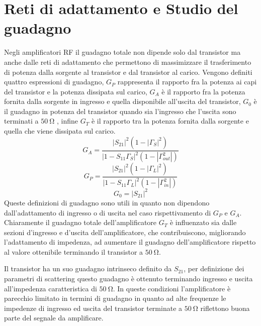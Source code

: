 \documentclass[12pt,oneside]{book}
\begin{document}
\section{Reti di adattamento e Studio del guadagno}
Negli amplificatori RF il guadagno totale non dipende solo dal transistor ma anche dalle reti di adattamento che permettono di massimizzare il trasferimento di potenza dalla sorgente al transistor e dal transistor al carico.
Vengono definiti quattro espressioni di guadagno, $G_P$ rappresenta il rapporto fra la potenza ai capi del transistor e la potenza dissipata sul carico,
$G_A$ è il rapporto fra la potenza fornita dalla sorgente in ingresso e quella disponibile all'uscita del transistor, $G_0$ è il guadagno in potenza del transistor quando sia l'ingresso che l'uscita sono terminati a $\SI{50}{\ohm}$ , infine $G_T$ è il rapporto tra la potenza fornita dalla sorgente e quella che viene dissipata sul carico.
\begin{equation}
    G_A = \dfrac{\left|S_{21}\right|^2\left(1-\left|\Gamma_{S}\right|^2\right)}{\left|1-S_{11}\Gamma_{S}\right|^2\left(1-\left|\Gamma_{out}^2\right|\right)}
\end{equation}
\begin{equation}
    G_P = \dfrac{\left|S_{21}\right|^2\left(1-\left|\Gamma_{L}\right|^2\right)}{\left|1-S_{11}\Gamma_{L}\right|^2\left(1-\left|\Gamma_{in}^2\right|\right)}
\end{equation}
\begin{equation}
    G_0 = \left|S_{21}\right|^2
\end{equation}
Queste definizioni di guadagno sono utili in quanto non dipendono dall'adattamento di ingresso o di uscita nel caso rispettivamento di $G_P$ e $G_A$. Chiaramente il guadagno totale dell'amplificatore $G_T$ è influenzato sia dalle sezioni d'ingresso e d'uscita dell'amplificatore, che contribuiscono, migliorando l'adattamento di impedenza, ad aumentare il guadagno dell'amplificatore rispetto al valore ottenibile terminando il transistor a $\SI{50}{\ohm}$.

Il transistor ha un suo guadagno intrinseco definito da $S_{21}$, per definizione dei parametri di scattering questo guadagno è ottenuto terminando ingresso e uscita all'impedenza caratteristica di $\SI{50}{\ohm}$. In queste condizioni l'amplificatore è parecchio limitato in termini di guadagno in quanto ad alte frequenze le impedenze di ingresso ed uscita del transistor terminate a $\SI{50}{\ohm}$ riflettono buona parte del segnale da amplificare.
\end{document}
